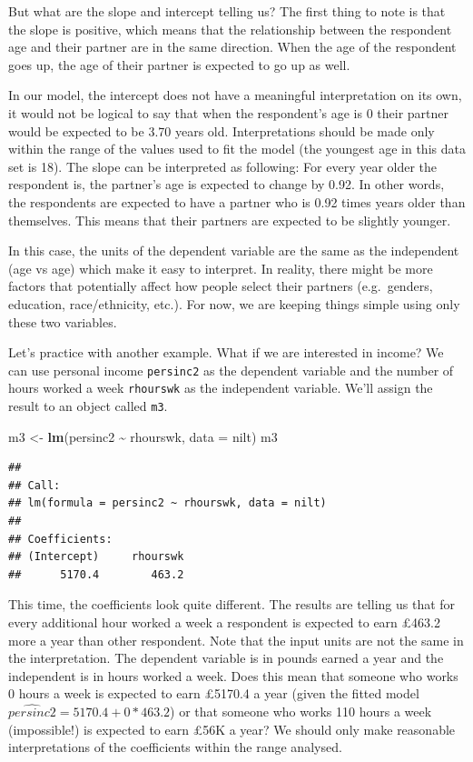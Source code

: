 \documentclass[
]{book}
\newenvironment{Shaded}{\begin{snugshade}}{\end{snugshade}}
\newcommand{\AttributeTok}[1]{\textcolor[rgb]{0.13,0.29,0.53}{#1}}
\newcommand{\FunctionTok}[1]{\textcolor[rgb]{0.13,0.29,0.53}{\textbf{#1}}}
\newcommand{\NormalTok}[1]{#1}
\newcommand{\OtherTok}[1]{\textcolor[rgb]{0.56,0.35,0.01}{#1}}
\newcommand{\SpecialCharTok}[1]{\textcolor[rgb]{0.81,0.36,0.00}{\textbf{#1}}}
\begin{document}
But what are the slope and intercept telling us? The first thing to note is that the slope is positive, which means that the relationship between the respondent age and their partner are in the same direction. When the age of the respondent goes up, the age of their partner is expected to go up as well.

In our model, the intercept does not have a meaningful interpretation on its own, it would not be logical to say that when the respondent's age is 0 their partner would be expected to be 3.70 years old. Interpretations should be made only within the range of the values used to fit the model (the youngest age in this data set is 18). The slope can be interpreted as following: For every year older the respondent is, the partner's age is expected to change by 0.92. In other words, the respondents are expected to have a partner who is 0.92 times years older than themselves. This means that their partners are expected to be slightly younger.

In this case, the units of the dependent variable are the same as the independent (age vs age) which make it easy to interpret. In reality, there might be more factors that potentially affect how people select their partners (e.g.~genders, education, race/ethnicity, etc.). For now, we are keeping things simple using only these two variables.

Let's practice with another example. What if we are interested in income? We can use personal income \texttt{persinc2} as the dependent variable and the number of hours worked a week \texttt{rhourswk} as the independent variable. We'll assign the result to an object called \texttt{m3}.

\begin{Shaded}
\begin{Highlighting}[]
\NormalTok{m3 }\OtherTok{\textless{}{-}} \FunctionTok{lm}\NormalTok{(persinc2 }\SpecialCharTok{\textasciitilde{}}\NormalTok{ rhourswk, }\AttributeTok{data =}\NormalTok{ nilt)}
\NormalTok{m3}
\end{Highlighting}
\end{Shaded}

\begin{verbatim}
## 
## Call:
## lm(formula = persinc2 ~ rhourswk, data = nilt)
## 
## Coefficients:
## (Intercept)     rhourswk  
##      5170.4        463.2
\end{verbatim}

This time, the coefficients look quite different. The results are telling us that for every additional hour worked a week a respondent is expected to earn £463.2 more a year than other respondent. Note that the input units are not the same in the interpretation. The dependent variable is in pounds earned a year and the independent is in hours worked a week. Does this mean that someone who works 0 hours a week is expected to earn £5170.4 a year (given the fitted model \(\hat{persinc2} = 5170.4 + 0*463.2\)) or that someone who works 110 hours a week (impossible!) is expected to earn £56K a year? We should only make reasonable interpretations of the coefficients within the range analysed.
\end{document}
